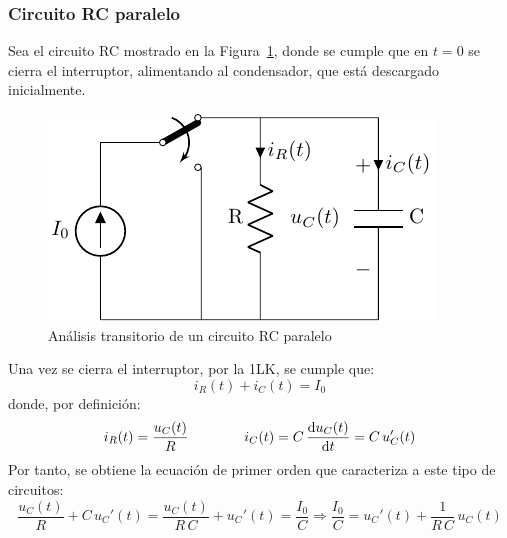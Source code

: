 \subsubsection{Circuito RC paralelo}
Sea el circuito RC mostrado en la Figura~\ref{fig:transitorio_RC},
donde se cumple que en $t = 0$ se cierra el interruptor, alimentando
al condensador, que está descargado inicialmente.
\begin{figure}[H]
  \centering \includegraphics{../figs/transitorio_circuitoRC.pdf}
  \caption{Análisis transitorio de un circuito RC paralelo}
  \label{fig:transitorio_RC}
\end{figure}
	
Una vez se cierra el interruptor, por la 1LK, se cumple que:
\begin{equation*}
  i_R(t) + i_C(t) = I_0
\end{equation*}
donde, por definición:
\begin{equation*}
  i_R(t)=\dfrac{u_C(t)}{R}\qquad\qquad i_C(t)=C\,\diff{u_C(t)}{t}=C\,u_C'(t)
\end{equation*}
Por tanto, se obtiene la ecuación de primer orden que caracteriza a
este tipo de circuitos:
\begin{equation}\label{eq:1orden_C}
  \dfrac{u_C(t)}{R}+C\, u_C'(t)=\dfrac{u_C(t)}{R\,C}+u_C'(t)=\dfrac{I_0}{C}\Rightarrow \boxed{\dfrac{I_0}{C}=u_C'(t)+\dfrac{1}{R\, C}\,u_C(t)}
\end{equation}
	
